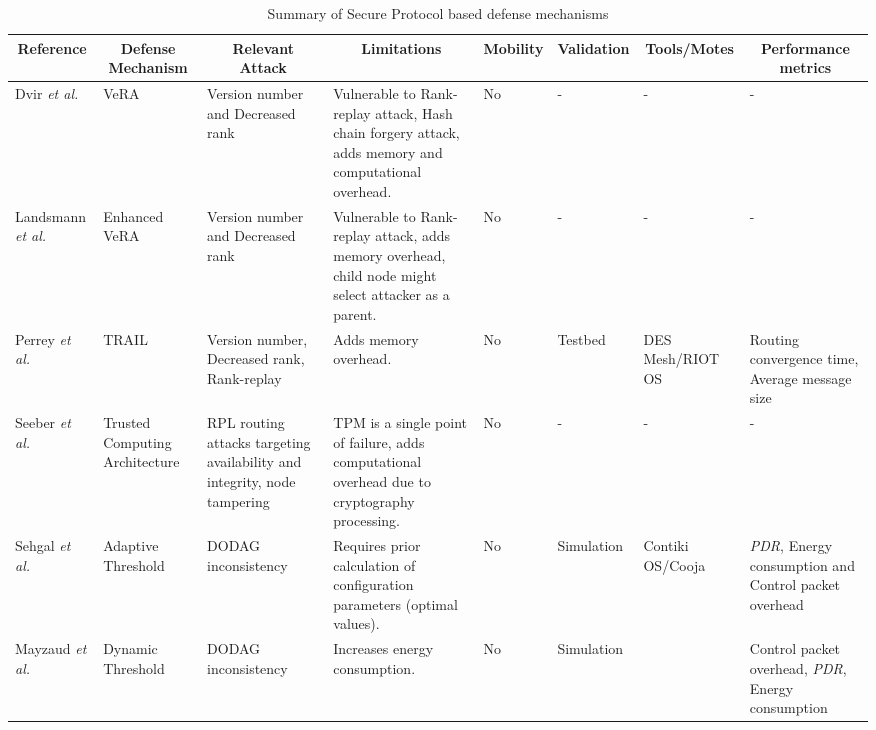 \documentclass[10pt,journal,sort & compress]{IEEEtran}
\begin{document}
\begin{landscape}
	\centering
	\begin{table}
		\small
		\caption{Summary of Secure Protocol based defense mechanisms}
		\label{SecureProtocol}
	\color{black}\begin{tabular}[l]{|p{2.2cm}|p{2.5cm}|p{4cm}|p{5cm}|p{0.3cm}|p{0.3cm}|p{1.6cm}|p{4cm}|}
			
			\hline
			\multicolumn{1}{|c|}{\textbf{Reference}} & \multicolumn{1}{c|}{\textbf{Defense Mechanism}} & \multicolumn{1}{c|}{\textbf{Relevant Attack}} & \multicolumn{1}{c|}{\textbf{Limitations}} & \multicolumn{1}{c|}{\textbf{Mobility}} & \multicolumn{1}{c|}{\textbf{Validation}} &
			\multicolumn{1}{c|}{\textbf{Tools/Motes}} &  \multicolumn{1}{c|}{\textbf{Performance metrics}} \\ \hline
			Dvir \textit{et al.} \cite{Dvir2011} & VeRA & Version number and Decreased rank & Vulnerable to Rank-replay attack, Hash chain forgery attack, adds memory and computational overhead. & No & - & - & - \\ \hline
			Landsmann \textit{et al.} \cite{landsmann2013topology} & Enhanced VeRA & Version number and Decreased rank & Vulnerable to Rank-replay attack, adds memory overhead, child node might select attacker as a parent. & No & - & - & - \\ \hline
			Perrey \textit{et al.} \cite{PerreyLUSW13} & TRAIL & Version number, Decreased rank, Rank-replay & Adds memory overhead. & No & Testbed & DES Mesh/RIOT OS & Routing convergence time, Average message size \\ \hline

			Seeber \textit{et al.} \cite{seeber2013towards} & Trusted Computing Architecture & RPL routing attacks targeting availability and integrity, node tampering & TPM is a single point of failure,  adds computational overhead due to  cryptography processing. & No & - &-  & - \\ \hline
			Sehgal \textit{et al.} \cite{Sehgal2014} & Adaptive Threshold & DODAG inconsistency & Requires prior calculation of configuration parameters (optimal values). & No & Simulation & Contiki OS/Cooja & \textit{PDR}, Energy consumption and Control packet overhead \\ \hline
			Mayzaud \textit{et al.} \cite{Mayzaud2015} & Dynamic Threshold & DODAG inconsistency & Increases energy consumption. & No & Simulation & & Control packet overhead, \textit{PDR}, Energy consumption \\ \hline
			

\end{tabular}
\end{table}
\end{landscape}
\end{document}
